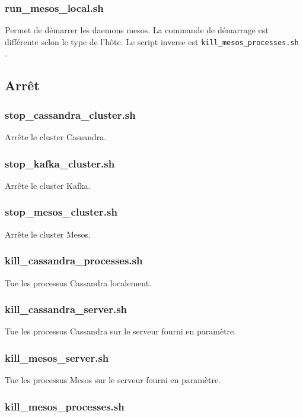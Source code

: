 \documentclass[a4paper, 11pt, titlepage]{article}
\begin{document}
\subsubsection*{run\_mesos\_local.sh}
Permet de démarrer les daemons mesos. La commande de démarrage est différente selon le type de l'hôte.
Le script inverse est \lstinline!kill_mesos_processes.sh! .



\subsection {Arrêt}

\subsubsection*{stop\_cassandra\_cluster.sh}
Arrête le cluster Cassandra.


\subsubsection*{stop\_kafka\_cluster.sh}
Arrête le cluster Kafka.


\subsubsection*{stop\_mesos\_cluster.sh}
Arrête le cluster Mesos.


\subsubsection*{kill\_cassandra\_processes.sh}

Tue les processus Cassandra localement.


\subsubsection*{kill\_cassandra\_server.sh}

Tue les processus Cassandra sur le serveur fourni en paramètre.


\subsubsection*{kill\_mesos\_server.sh}

Tue les processus Mesos sur le serveur fourni en paramètre.


\subsubsection*{kill\_mesos\_processes.sh}
\end{document}
